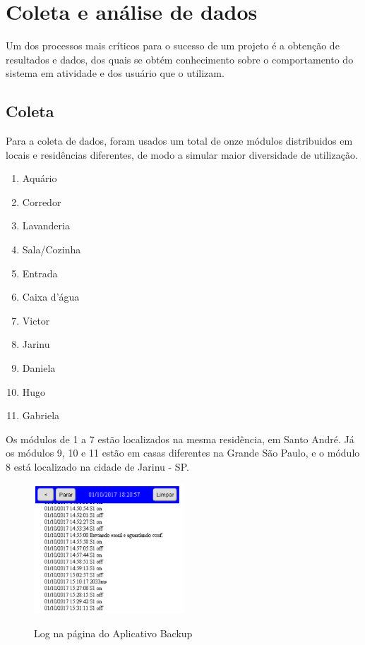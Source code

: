 \chapter{Coleta e análise de dados \label{coletaAnaliseDados}}

Um dos processos mais críticos para o sucesso de um projeto é a obtenção de resultados e dados, dos quais se obtém conhecimento sobre o comportamento do sistema em atividade e dos usuário que o utilizam.

\section{Coleta}

Para a coleta de dados, foram usados um total de onze módulos distribuidos em locais e residências diferentes, de modo a simular maior diversidade de utilização.

\begin{enumerate}
	\item Aquário
	\item Corredor
	\item Lavanderia
	\item Sala/Cozinha
	\item Entrada
	\item Caixa d’água
	\item Victor
	\item Jarinu
	\item Daniela
	\item Hugo
	\item Gabriela
\end{enumerate}

Os módulos de 1 a 7 estão localizados na mesma residência, em Santo André. Já os módulos 9, 10 e 11 estão em casas diferentes na Grande São Paulo, e o módulo 8 está localizado na cidade de Jarinu - SP.

\begin{figure}[H]
	\centering
	\caption{Log na página do Aplicativo Backup}
	\includegraphics[width=0.5\textwidth]{logAppBackup}
	\label{fig:logAppBackup}
\end{figure}

